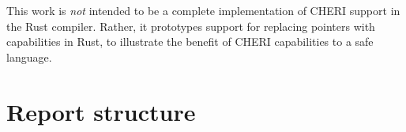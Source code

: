 \documentclass[dissertation.tex]{subfiles}
\begin{document}
This work is \emph{not} intended to be a complete implementation of
CHERI support in the Rust compiler.
Rather, it prototypes support for replacing pointers with capabilities
in Rust, to illustrate the benefit of CHERI capabilities to a safe
language.


\section{Report structure}
\todo{}
\end{document}
